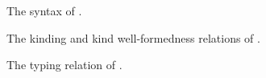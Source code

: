 \documentclass{article}
\begin{document}
\begin{figure}[t]
    \scriptsize
    
    \caption{The syntax of \mcorecalc.}
    \label{fig:mcore-syntax}
\end{figure}

\begin{figure}[t]
    \scriptsize
    
    
    \caption{The kinding and kind well-formedness relations of \mcorecalc.}
    \label{fig:mcore-kinding}
\end{figure}

\begin{figure}[t]
    \scriptsize
    
    \caption{The typing relation of \mcorecalc.}
    \label{fig:mcore-typing}
\end{figure}
\end{document}
